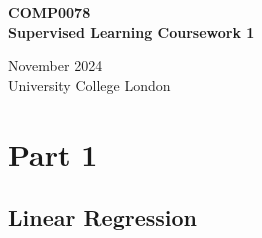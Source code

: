 \documentclass[final,3p,times,12pt]{article}
\begin{document}
\begin{titlepage}
    \centering
    \vspace*{2cm}
    
    {\Large \textbf{COMP0078}}\\[1cm] %
    {\Huge \textbf{Supervised Learning Coursework 1}}\\[1cm] %
    
    \vspace{1cm}
    
    {\Large November 2024}\\[1.5cm] %
    
    {\Large University College London} %
    
    \vfill
    
    
    \vspace{2cm}
    
\end{titlepage}
\newpage

\tableofcontents
\newpage


\section{Part 1}

\subsection{Linear Regression}
\end{document}
